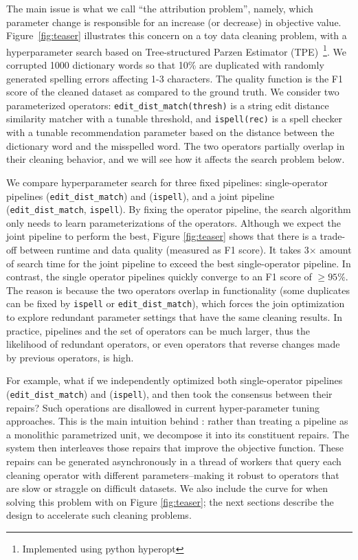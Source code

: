 The main issue is what we call ``the attribution problem'', namely, which parameter change is responsible for an increase (or decrease) in objective value.
Figure~\ref{fig:teaser} illustrates this concern on a toy data cleaning problem, with a hyperparameter search based on Tree-structured Parzen Estimator (TPE)~\cite{shahriari2016taking}\footnote{Implemented using \textsf{python hyperopt}}.  We corrupted 1000 dictionary words so that 10\% are duplicated with randomly generated spelling errors affecting 1-3 characters. The quality function is the F1 score of the cleaned dataset as compared to the ground truth.  We consider two parameterized operators: \texttt{edit\_dist\_match(thresh)} is a string edit distance similarity matcher with a tunable threshold, and \texttt{ispell(rec)} is a spell checker with a tunable recommendation parameter based on the distance between the dictionary word and the misspelled word.  The two operators partially overlap in their cleaning behavior, and we will see how it affects the search problem below.   

We compare hyperparameter search for three fixed pipelines:  single-operator pipelines (\texttt{edit\_dist\_match}) and (\texttt{ispell}), and a joint pipeline (\texttt{edit\_dist\_match}, \texttt{ispell}).  By fixing the operator pipeline, the search algorithm only needs to learn parameterizations of the operators.  Although we expect the joint pipeline to perform the best, Figure \ref{fig:teaser} shows that there is a trade-off between runtime and data quality (measured as F1 score).  It takes 3$\times$ amount of search time for the joint pipeline to exceed the best single-operator pipeline.    In contrast, the single operator pipelines quickly converge to an F1 score of $\ge95\%$.  The reason is because the two operators overlap in functionality (some duplicates can be fixed by \texttt{ispell} or \texttt{edit\_dist\_match}), which forces the join optimization to explore redundant parameter settings that have the same cleaning results.  In practice, pipelines and the set of operators can be much larger, thus the likelihood of redundant operators, or even operators that reverse changes made by previous operators, is high.

For example, what if we independently optimized both single-operator pipelines (\texttt{edit\_dist\_match}) and (\texttt{ispell}), and then took the consensus between their repairs?
Such operations are disallowed in current hyper-parameter tuning approaches. 
This is the main intuition behind \sys: rather than treating a pipeline as a monolithic parametrized unit, we decompose it into its constituent repairs.
The system then interleaves those repairs that improve the objective function.
These repairs can be generated asynchronously in a thread of workers that query each cleaning operator with different parameters--making it robust to operators that are slow or straggle on difficult datasets.
We also include the curve for when solving this problem with \sys on Figure \ref{fig:teaser}; the next sections describe the design to accelerate such cleaning problems.









